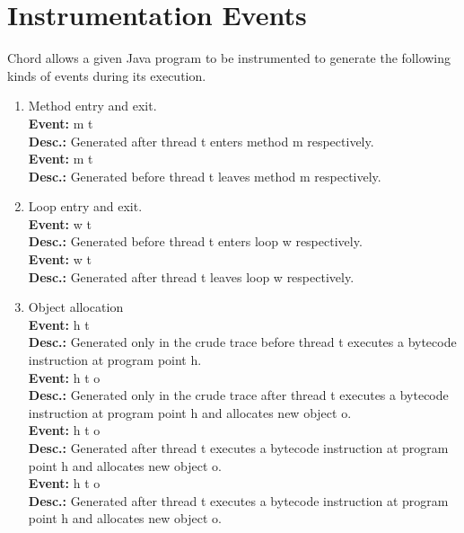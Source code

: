 \section{Instrumentation Events}
\label{sec:instr-events}

Chord allows a given Java program to be instrumented to generate the
following kinds of events during its execution.

\begin{enumerate}
\item
Method entry and exit. \\
{\bf Event:}  m t \\
{\bf Desc.:} Generated after thread t enters method m respectively. \\
{\bf Event:}  m t \\
{\bf Desc.:} Generated before thread t leaves method m respectively.

\item
Loop entry and exit. \\
{\bf Event:}  w t \\
{\bf Desc.:} Generated before thread t enters loop w respectively. \\
{\bf Event:}  w t \\
{\bf Desc.:} Generated after thread t leaves loop w respectively.

\item
Object allocation \\
{\bf Event:}  h t \\
{\bf Desc.:} Generated only in the crude trace before thread t executes a  bytecode instruction at program point h. \\
{\bf Event:}  h t o \\
{\bf Desc.:} Generated only in the crude trace after thread t executes a  bytecode instruction at program point h and allocates new object o. \\
{\bf Event:}  h t o \\
{\bf Desc.:} Generated after thread t executes a  bytecode instruction at program point h and allocates new object o. \\
{\bf Event:}  h t o \\
{\bf Desc.:} Generated after thread t executes a  bytecode instruction at program point h and allocates new object o.


\end{enumerate}
